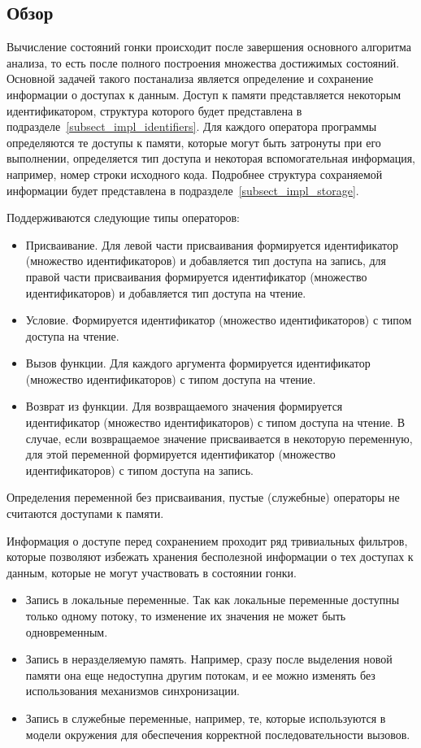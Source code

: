 \subsection{Обзор}
\label{subsect_impl_race_overview}
Вычисление состояний гонки происходит после завершения основного алгоритма анализа, то есть после полного построения множества достижимых состояний.
Основной задачей такого постанализа является определение и сохранение информации о доступах к данным. 
Доступ к памяти представляется некоторым идентификатором, структура которого будет представлена в подразделе~\ref{subsect_impl_identifiers}.
Для каждого оператора программы определяются те доступы к памяти, которые могут быть затронуты при его выполнении, определяется тип доступа и некоторая вспомогательная информация, например, номер строки исходного кода.
Подробнее структура сохраняемой информации будет представлена в подразделе~\ref{subsect_impl_storage}.

Поддерживаются следующие типы операторов:
\begin{itemize}
\item Присваивание. Для левой части присваивания формируется идентификатор (множество идентификаторов) и добавляется тип доступа на запись, для правой части присваивания формируется идентификатор (множество идентификаторов) и добавляется тип доступа на чтение.
\item Условие. Формируется идентификатор (множество идентификаторов) с типом доступа на чтение.
\item Вызов функции. Для каждого аргумента формируется идентификатор (множество идентификаторов) с типом доступа на чтение.
\item Возврат из функции. Для возвращаемого значения формируется идентификатор (множество идентификаторов) с типом доступа на чтение. В случае, если возвращаемое значение присваивается в некоторую переменную, для этой переменной формируется идентификатор (множество идентификаторов) с типом доступа на запись.
\end{itemize}
Определения переменной без присваивания, пустые (служебные) операторы не считаются доступами к памяти.

Информация о доступе перед сохранением проходит ряд тривиальных фильтров, которые позволяют избежать хранения бесполезной информации о тех доступах к данным, которые не могут участвовать в состоянии гонки.

\begin{itemize}
\item Запись в локальные переменные. Так как локальные переменные доступны только одному потоку, то изменение их значения не может быть одновременным.
\item Запись в неразделяемую память. Например, сразу после выделения новой памяти она еще недоступна другим потокам, и ее можно изменять без использования механизмов синхронизации.
\item Запись в служебные переменные, например, те, которые используются в модели окружения для обеспечения корректной последовательности вызовов. 
\end{itemize}

